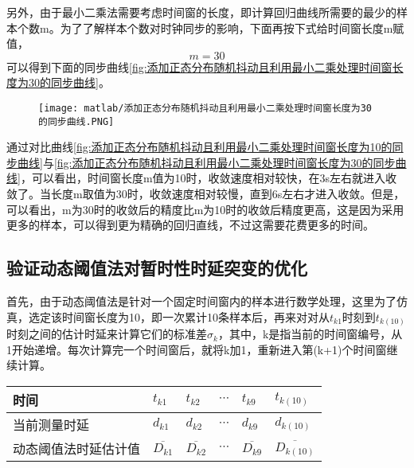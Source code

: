 另外，由于最小二乘法需要考虑时间窗的长度，即计算回归曲线所需要的最少的样本个数m。为了了解样本个数对时钟同步的影响，下面再按下式给时间窗长度m赋值，
\begin{equation}
  m = 30
\end{equation}
可以得到下面的同步曲线\ref{fig:添加正态分布随机抖动且利用最小二乘处理时间窗长度为30的同步曲线}。
\begin{figure}[!hbp]
  \centering
  \begin{minipage}[b]{1\textwidth}
    \captionstyle{\centering}
    \centering
    \texttt{[image: matlab/添加正态分布随机抖动且利用最小二乘处理时间窗长度为30的同步曲线.PNG]}
  \end{minipage}     
\end{figure}

通过对比曲线\ref{fig:添加正态分布随机抖动且利用最小二乘处理时间窗长度为10的同步曲线}与\ref{fig:添加正态分布随机抖动且利用最小二乘处理时间窗长度为30的同步曲线}，可以看出，时间窗长度m值为10时，收敛速度相对较快，在3s左右就进入收敛了。当长度m取值为30时，收敛速度相对较慢，直到6s左右才进入收敛。但是，可以看出，m为30时的收敛后的精度比m为10时的收敛后精度更高，这是因为采用更多的样本，可以得到更为精确的回归直线，不过这需要花费更多的时间。

\subsection{验证动态阈值法对暂时性时延突变的优化}
首先，由于动态阈值法是针对一个固定时间窗内的样本进行数学处理，这里为了仿真，选定该时间窗长度为10，即一次累计10条样本后，再来对对从$t_{k1}$时刻到$t_{k(10)}$时刻之间的估计时延来计算它们的标准差$\sigma_{k}$，其中，k是指当前的时间窗编号，从1开始递增。每次计算完一个时间窗后，就将k加1，重新进入第(k+1)个时间窗继续计算。
\begin{table}[!hpb]
  \centering
  \begin{tabular}{llllll} \toprule
    时间 & $t_{k1}$ & $t_{k2}$ & $\cdots$ & $t_{k9}$ & $t_{k(10)}$ \\ \midrule
    当前测量时延 & $d_{k1}$ & $d_{k2}$ & $\cdots$ & $d_{k9}$ & $d_{k(10)}$ \\ \midrule
    动态阈值法时延估计值 & $\overline{D_{k1}}$ & $\overline{D_{k2}}$ & $\cdots$ & $\overline{D_{k9}}$ & $\overline{D_{k(10)}}$  \\ \bottomrule
  \end{tabular}
\end{table}


